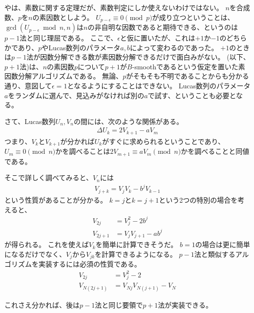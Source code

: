 やは、素数に関する定理だが、素数判定にしか使えないわけではない。
$n$を合成数、$p$を$n$の素因数としよう。
$U_{p-\epsilon} \equiv 0 \pmod{p}$が成り立つということは、$\gcd(U_{p-\epsilon} \bmod{n}, n)$は$n$の非自明な因数であると期待できる、というのは$p-1$法と同じ理屈である。
ここで、$\epsilon$と仮に置いたが、これは$+1$か$-1$のどちらかであり、$p$やLucas数列のパラメータ$a,b$によって変わるのであった。
$+1$のときは$p-1$法が因数分解できる数が素因数分解できるだけで面白みがない。
(以下、$p+1$法)は、$n$の素因数$p$について$p+1$が$B$-smoothであるという仮定を置いた素因数分解アルゴリズムである\cite{Williams1982}。
無論、$p$がそもそも不明であることからも分かる通り、意図して$\epsilon=1$となるようにすることはできない。
Lucas数列のパラメータ$a$をランダムに選んで、見込みがなければ別の$a$で試す、ということも必要となる。

さて、Lucas数列$U_n,V_n$の間には、次のような関係がある。
\begin{align*}
\Delta U_k = 2V_{k+1}-aV_m
\end{align*}
つまり、$V_k$と$V_{k+1}$が分かれば$U_k$がすぐに求められるということであり、$U_m \equiv 0 \pmod{n}$かを調べることは$2V_{m+1}\equiv aV_m \pmod{n}$かを調べることと同値である。

そこで詳しく調べてみると、$V_n$には
\begin{align*}
V_{j+k} = V_jV_k - b^jV_{k-1}
\end{align*}
という性質があることが分かる。
$k=j$と$k=j+1$という2つの特別の場合を考えると、
\begin{align*}
V_{2j} &= V_j^2 - 2b^j\\
V_{2j+1} &= V_jV_{j+1} - ab^j
\end{align*}
が得られる。
これを使えば$V_k$を簡単に計算できそうだ。
$b=1$の場合は更に簡単になるだけでなく、$V_j$から$V_{jk}$を計算できるようになる。
$p-1$法と類似するアルゴリズムを実装するには必須の性質である。
\begin{align*}
V_{2j} &= V_j^2 - 2\\
V_{N(2j+1)} &= V_{Nj}V_{N(j+1)} - V_N
\end{align*}


これさえ分かれば、後は$p-1$法と同じ要領で$p+1$法が実装できる。

